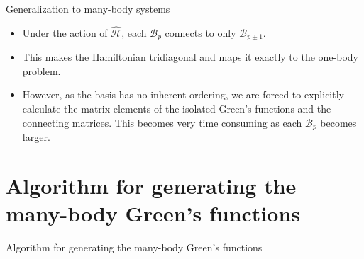 \documentclass[usenames,dvipsnames]{beamer}
\newcommand{\ham}{\hat{\mathcal{H}}}
\begin{document}
	\begin{frame}
		{Generalization to many-body systems}
	\begin{itemize}
		\item {
			Under the action of $ \ham $, each $ \mathcal{B}_p $ connects to only $ \mathcal{B}_{p \pm 1} $.
			}
		\item{
			This makes the Hamiltonian tridiagonal and maps it exactly to the one-body problem.
			}
		\item {
			However, as the basis has no inherent ordering, we are forced to explicitly calculate the matrix elements of the isolated Green's functions and the connecting matrices. This becomes very time consuming as each $ \mathcal{B}_p $ becomes larger.
			}
	\end{itemize}
	\end{frame}

\section{Algorithm for generating the many-body Green's functions}
\begin{frame}
	\centering
	{\Huge Algorithm for generating the many-body Green's functions}
\end{frame}
\end{document}
